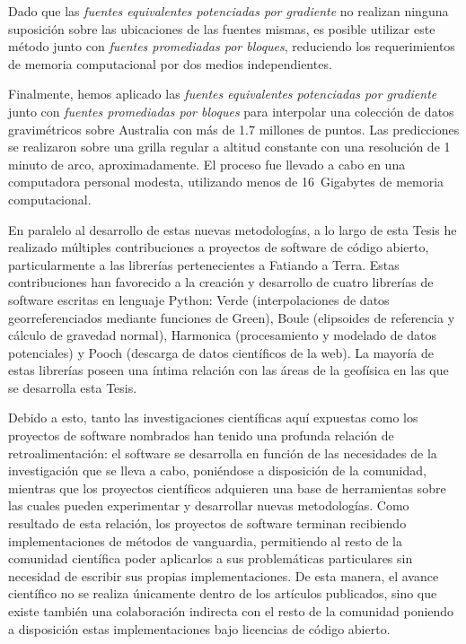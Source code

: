 Dado que las \emph{fuentes equivalentes potenciadas por gradiente} no realizan
ninguna suposición sobre las ubicaciones de las fuentes mismas, es posible
utilizar este método junto con \emph{fuentes promediadas por bloques},
reduciendo los requerimientos de memoria computacional por dos medios
independientes.

Finalmente, hemos aplicado las \emph{fuentes equivalentes potenciadas por
gradiente} junto con \emph{fuentes promediadas por bloques} para interpolar una
colección de datos gravimétricos sobre Australia con más de 1.7 millones de
puntos.
Las predicciones se realizaron sobre una grilla regular a altitud constante con
una resolución de 1 minuto de arco, aproximadamente.
El proceso fue llevado a cabo en una computadora personal modesta, utilizando
menos de 16~Gigabytes de memoria computacional.

\vspace{1em}

En paralelo al desarrollo de estas nuevas metodologías, a lo largo de esta
Tesis he realizado múltiples contribuciones a proyectos de software de código
abierto, particularmente a las librerías pertenecientes a Fatiando a Terra.
Estas contribuciones han favorecido a la creación y desarrollo de cuatro
librerías de software escritas en lenguaje Python: Verde (interpolaciones de
datos georreferenciados mediante funciones de Green), Boule (elipsoides de
referencia y cálculo de gravedad normal), Harmonica (procesamiento y modelado
de datos potenciales) y Pooch (descarga de datos científicos de la web).
La mayoría de estas librerías poseen una íntima relación con las áreas de la
geofísica en las que se desarrolla esta Tesis.

Debido a esto, tanto las investigaciones científicas aquí expuestas como los
proyectos de software nombrados han tenido una profunda relación de
retroalimentación: el software se desarrolla en función de las necesidades de
la investigación que se lleva a cabo, poniéndose a disposición de la comunidad,
mientras que los proyectos científicos adquieren una base de herramientas
sobre las cuales pueden experimentar y desarrollar nuevas metodologías.
Como resultado de esta relación, los proyectos de software terminan recibiendo
implementaciones de métodos de vanguardia, permitiendo al resto de la comunidad
científica poder aplicarlos a sus problemáticas particulares sin necesidad de
escribir sus propias implementaciones.
De esta manera, el avance científico no se realiza únicamente dentro de los
artículos publicados, sino que existe también una colaboración indirecta con el
resto de la comunidad poniendo a disposición estas implementaciones bajo
licencias de código abierto.

